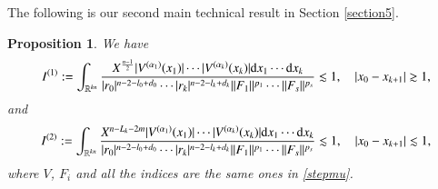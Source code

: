 \documentclass[11pt,reqno]{amsart}
\def\d{{\rm d}}
\newtheorem{proposition}[theorem]{Proposition}
\numberwithin{equation}{section}
\theoremstyle{definition}
\begin{document}
The following is our second main technical result in Section \ref{section5}.

\begin{proposition}\label{intmainest}
	We have
	\begin{equation*}
		I^{(1)}:=\int_{\mathbb{R}^{kn}}\frac{X^\frac{n-1}{2}|V^{(\alpha_1)}(x_1)|\cdots|V^{(\alpha_k)}(x_k)|\d x_1\cdots \d x_k}{|r_0|^{n-2-l_0+d_0}\cdots|r_k|^{n-2-l_k+d_k}\|F_1\|^{p_1}\cdots\|F_s\|^{p_s}}\lesssim1,\quad|x_0-x_{k+1}|\gtrsim1,
	\end{equation*}
	and
	\begin{equation*}
		I^{(2)}:=\int_{\mathbb{R}^{kn}}\frac{X^{n-L_k-2m}|V^{(\alpha_1)}(x_1)|\cdots|V^{(\alpha_k)}(x_k)|\d x_1\cdots \d x_k}{|r_0|^{n-2-l_0+d_0}\cdots|r_k|^{n-2-l_k+d_k}\|F_1\|^{p_1}\cdots\|F_s\|^{p_s}}\lesssim1,\quad|x_0-x_{k+1}|\lesssim1,
	\end{equation*}
	where $V$, $F_i$ and all the indices are the same ones in \eqref{stepmu}.
\end{proposition}
\end{document}

